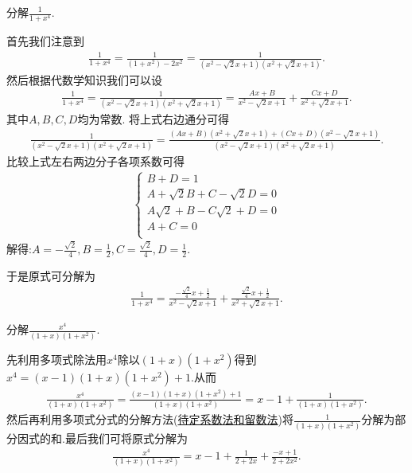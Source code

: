 \documentclass[../../main.tex]{subfiles}
\begin{document}
\begin{example}
分解$\frac{1}{1+x^4}$.
\end{example}
\begin{solution}
首先我们注意到
\begin{align*}
\frac{1}{1+x^4}=\frac{1}{\left( 1+x^2 \right) -2x^2}=\frac{1}{\left( x^2-\sqrt{2}x+1 \right) \left( x^2+\sqrt{2}x+1 \right)}.
\end{align*}
然后根据代数学知识我们可以设
\begin{align}\label{equation:little tech eq3}
\frac{1}{1+x^4}=\frac{1}{\left( x^2-\sqrt{2}x+1 \right) \left( x^2+\sqrt{2}x+1 \right)}=\frac{Ax+B}{x^2-\sqrt{2}x+1}+\frac{Cx+D}{x^2+\sqrt{2}x+1}.  
\end{align}
其中$A,B,C,D$均为常数.
将上式右边通分可得
\begin{align*}
\frac{1}{\left( x^2-\sqrt{2}x+1 \right) \left( x^2+\sqrt{2}x+1 \right)}=\frac{\left( Ax+B \right) \left( x^2+\sqrt{2}x+1 \right) +\left( Cx+D \right) \left( x^2-\sqrt{2}x+1 \right)}{\left( x^2-\sqrt{2}x+1 \right) \left( x^2+\sqrt{2}x+1 \right)}.
\end{align*}
比较上式左右两边分子各项系数可得
\begin{align*}
\begin{cases}
B+D=1\\
A+\sqrt{2}B+C-\sqrt{2}D=0\\
A\sqrt{2}+B-C\sqrt{2}+D=0\\
A+C=0\\
\end{cases}
\end{align*}
解得:$A=-\frac{\sqrt{2}}{4},B=\frac{1}{2},C=\frac{\sqrt{2}}{4},D=\frac{1}{2}$.

于是原式可分解为
\begin{align*}
\frac{1}{1+x^4}=\frac{-\frac{\sqrt{2}}{4}x+\frac{1}{2}}{x^2-\sqrt{2}x+1}+\frac{\frac{\sqrt{2}}{4}x+\frac{1}{2}}{x^2+\sqrt{2}x+1}.
\end{align*}
\end{solution}

\begin{example}
分解$\frac{x^4}{(1+x)(1+x^2)}$.
\end{example}
\begin{solution}
先利用多项式除法用$x^4$除以$(1+x)(1+x^2)$得到$x^4=\left( x-1 \right) \left( 1+x \right) \left( 1+x^2 \right) +1$.从而
\begin{align*}
\frac{x^4}{\left( 1+x \right) \left( 1+x^2 \right)}=\frac{\left( x-1 \right) \left( 1+x \right) \left( 1+x^2 \right) +1}{\left( 1+x \right) \left( 1+x^2 \right)}=x-1+\frac{1}{\left( 1+x \right) \left( 1+x^2 \right)}.
\end{align*}
然后再利用多项式分式的分解方法(\hyperref[将多项式分式分解为其部分因式的和常用方法]{待定系数法和留数法})将$\frac{1}{\left( 1+x \right) \left( 1+x^2 \right)}$分解为部分因式的和.最后我们可将原式分解为
\begin{align*}
\frac{x^4}{\left( 1+x \right) \left( 1+x^2 \right)}=x-1+\frac{1}{2+2x}+\frac{-x+1}{2+2x^2}.
\end{align*}
\end{solution}
\end{document}
